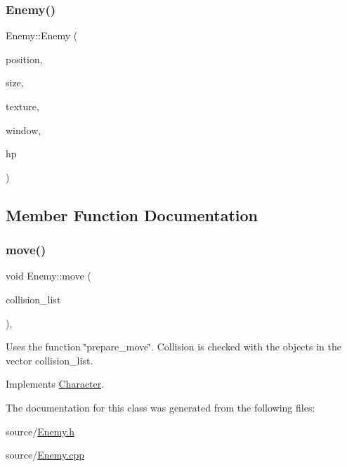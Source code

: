 \subsubsection{\texorpdfstring{Enemy()}{Enemy()}}
{\footnotesize\ttfamily Enemy\+::\+Enemy (\begin{DoxyParamCaption}\item[{std\+::shared\+\_\+ptr$<$ sf\+::\+Vector2f $>$}]{position,  }\item[{std\+::shared\+\_\+ptr$<$ sf\+::\+Vector2f $>$}]{size,  }\item[{std\+::shared\+\_\+ptr$<$ sf\+::\+Texture $>$}]{texture,  }\item[{sf\+::\+Render\+Window $\ast$}]{window,  }\item[{int}]{hp }\end{DoxyParamCaption})}



\subsection{Member Function Documentation}
\mbox{\label{classEnemy_a8e842aa8ab6c75f2c9d71c6c3f43d88c}} 
\subsubsection{\texorpdfstring{move()}{move()}}
{\footnotesize\ttfamily void Enemy\+::move (\begin{DoxyParamCaption}\item[{std\+::vector$<$ std\+::shared\+\_\+ptr$<$ \hyperlink{classObject}{Object} $>$$>$}]{collision\+\_\+list }\end{DoxyParamCaption})\hspace{0.3cm}{\ttfamily [override]}, {\ttfamily [virtual]}}

Uses the function \char`\"{}prepare\+\_\+move\char`\"{}. Collision is checked with the objects in the vector collision\+\_\+list. 

Implements \hyperlink{classCharacter_a91211cae08aab6a74b43377e4463283a}{Character}.



The documentation for this class was generated from the following files\+:\begin{DoxyCompactItemize}
\item 
source/\hyperlink{Enemy_8h}{Enemy.\+h}\item 
source/\hyperlink{Enemy_8cpp}{Enemy.\+cpp}\end{DoxyCompactItemize}
